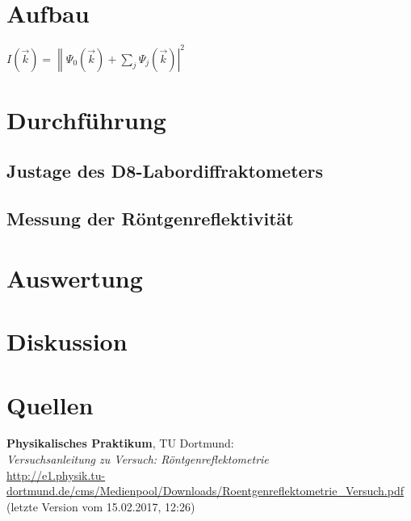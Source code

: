 \documentclass[captions=tableheading]{scrartcl}
\begin{document}
\section{Aufbau}
$I\left(\vec{k}\right)=\left\|\Psi_0\left(\vec{k}\right)+\sum\limits_j\Psi_j\left( \vec{k} \right) \right|^2$

\section{Durchführung}

\subsection{Justage des D8-Labordiffraktometers}

\subsection{Messung der Röntgenreflektivität}

\section{Auswertung}

\section{Diskussion}


\section{Quellen}
\begin{enumerate}[label={[\arabic*]}]
\item \label{q:anleitung} \textbf{Physikalisches Praktikum}, TU Dortmund: \\
\textit{Versuchsanleitung zu Versuch: Röntgenreflektometrie} \\
\url{http://e1.physik.tu-dortmund.de/cms/Medienpool/Downloads/Roentgenreflektometrie_Versuch.pdf} (letzte Version vom 15.02.2017, 12:26)
\end{enumerate}
\end{document}
